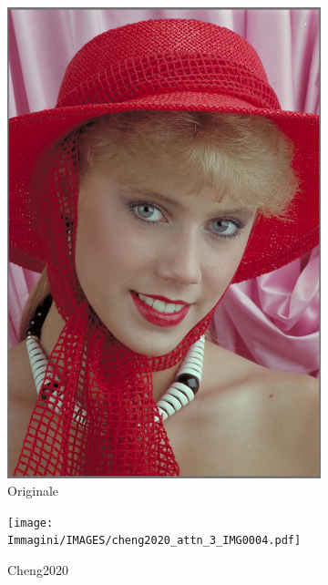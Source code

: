 \begin{figure}[t!]
    \centering
    \begin{subfigure}[]{0.25\textwidth}
        \includegraphics[width=\textwidth]{Immagini/IMAGES/PNG_IMG0004.pdf}
        \caption{Originale}
        \label{fig:OriginalChang2020}
    \end{subfigure}
    \hspace*{0.5cm}
    \begin{subfigure}[]{0.25\textwidth}
        \texttt{[image: Immagini/IMAGES/cheng2020\_attn\_3\_IMG0004.pdf]}
        \caption{Cheng2020}
        \label{fig:CompressedCheng2020}
    \end{subfigure}
    \hspace*{0.5cm}
    \begin{subfigure}[]{0.25\textwidth}

\end{subfigure}
\end{figure}
